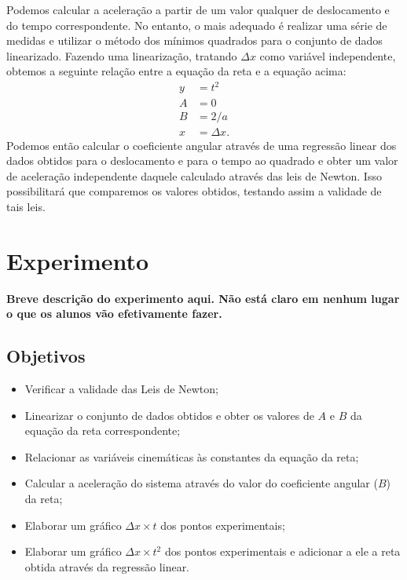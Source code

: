 Podemos calcular a aceleração a partir de um valor qualquer de deslocamento e do tempo correspondente. No entanto, o mais adequado é realizar uma série de medidas e utilizar o método dos mínimos quadrados para o conjunto de dados linearizado. Fazendo uma linearização, tratando $\Delta x$ como variável independente, obtemos a seguinte relação entre a equação da reta e a equação acima:
\begin{align}
	y &= t^2 \\
	A &= 0 \\
	B &= 2/a \\
	x &= \Delta x.
\end{align}
%
Podemos então calcular o coeficiente angular através de uma regressão linear dos dados obtidos para o deslocamento e para o tempo ao quadrado e obter um valor de aceleração independente daquele calculado através das leis de Newton. Isso possibilitará que comparemos os valores obtidos, testando assim a validade de tais leis.

\section{Experimento}

\textbf{Breve descrição do experimento aqui. Não está claro em nenhum lugar o que os alunos vão efetivamente fazer.}

\subsection{Objetivos}

\begin{itemize}
     \item Verificar a validade das Leis de Newton;
	 \item Linearizar o conjunto de dados obtidos e obter os valores de $A$ e $B$ da equação da reta correspondente;
	 \item Relacionar as variáveis cinemáticas às constantes da equação da reta;
     \item Calcular a aceleração do sistema através do valor do coeficiente angular ($B$) da reta;
     \item Elaborar um gráfico $\Delta x \times t$ dos pontos experimentais;
	 \item Elaborar um gráfico $\Delta x \times t^2$ dos pontos experimentais e adicionar a ele a reta obtida através da regressão linear.
\end{itemize}

